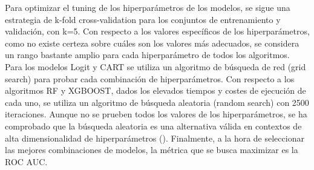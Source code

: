 Para optimizar el tuning de los hiperparámetros de los modelos, se sigue una estrategia de k-fold cross-validation para los conjuntos de entrenamiento y validación, con k=5. Con respecto a los valores específicos de los hiperparámetros, como no existe certeza sobre cuáles son los valores más adecuados, se considera un rango bastante amplio para cada hiperparámetro de todos los algoritmos. Para los modelos Logit y CART se utiliza un algoritmo de búsqueda de red (grid search) para probar cada combinación de hiperparámetros. Con respecto a los algoritmos RF y XGBOOST, dados los elevados tiempos y costes de ejecución de cada uno, se utiliza un algoritmo de búsqueda aleatoria (random search) con 2500 iteraciones. Aunque no se prueben todos los valores de los hiperparámetros, se ha comprobado que la búsqueda aleatoria es una alternativa válida en contextos de alta dimensionalidad de hiperparámetros (\cite{bergstra2012random}). Finalmente, a la hora de seleccionar las mejores combinaciones de modelos, la métrica que se busca maximizar es la ROC AUC.